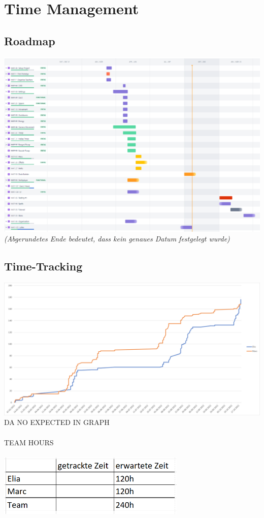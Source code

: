 \chapter{Time Management}

\section{Roadmap}
\includegraphics[width=15cm]{resources/roadmap_r.png}\\
\textit{(Abgerundetes Ende bedeutet, dass kein genaues Datum festgelegt wurde)}

\section{Time-Tracking}
\includegraphics*[width=15cm]{resources/graph.png}\\
DA NO EXPECTED IN GRAPH\\
\\
TEAM HOURS\\
\\
\includegraphics*[width=9cm]{resources/tracket_time_temp.png}\\




